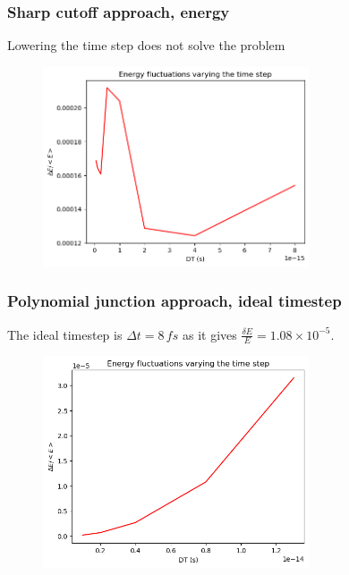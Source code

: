 \documentclass{beamer}
\begin{document}
\begin{frame}
    \frametitle{Sharp cutoff approach, energy}

    \begin{center}
        Lowering the time step does not solve the problem
    \end{center}

    \begin{figure}
        \includegraphics[width=0.7\textwidth]{images/lowertimestepawful.png}
    \end{figure}

\end{frame}

\begin{frame}
    \frametitle{Polynomial junction approach, ideal timestep}

    The ideal timestep is $\Delta t = 8\,fs$ as it gives $\frac{\delta E}{E}= 1.08 \times 10^{-5}$.
    \begin{figure}
        \includegraphics[width=0.7\textwidth]{images/lowertimestepamazing.png}
    \end{figure}

\end{frame}
\end{document}
